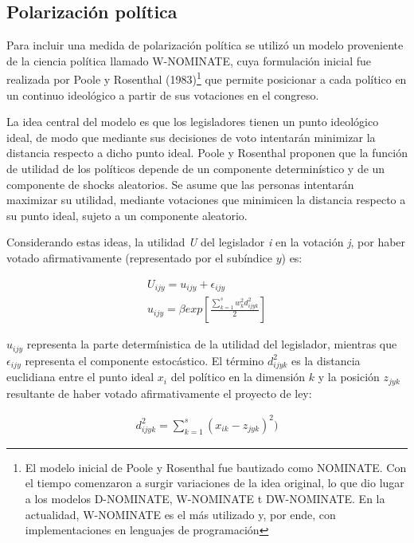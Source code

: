 \documentclass[
  12pt,
]{article}
\begin{document}
\hypertarget{polarizaciuxf3n-poluxedtica}{%
\subsection{\texorpdfstring{Polarización política
\label{apartado_nominate}}{Polarización política }}\label{polarizaciuxf3n-poluxedtica}}

Para incluir una medida de polarización política se utilizó un modelo
proveniente de la ciencia política llamado W-NOMINATE, cuya formulación
inicial fue realizada por Poole y Rosenthal
(1983)\footnote{El modelo inicial de Poole y Rosenthal fue bautizado como NOMINATE. Con el tiempo comenzaron a surgir variaciones de la idea original, lo que dio lugar a los modelos D-NOMINATE, W-NOMINATE t DW-NOMINATE. En la actualidad, W-NOMINATE es el más utilizado y, por ende, con implementaciones en lenguajes de programación}
que permite posicionar a cada político en un continuo ideológico a
partir de sus votaciones en el congreso.

La idea central del modelo es que los legisladores tienen un punto
ideológico ideal, de modo que mediante sus decisiones de voto intentarán
minimizar la distancia respecto a dicho punto ideal. Poole y Rosenthal
proponen que la función de utilidad de los políticos depende de un
componente determinístico y de un componente de shocks aleatorios. Se
asume que las personas intentarán maximizar su utilidad, mediante
votaciones que minimicen la distancia respecto a su punto ideal, sujeto
a un componente aleatorio.

Considerando estas ideas, la utilidad \emph{U} del legislador \emph{i}
en la votación \emph{j}, por haber votado afirmativamente (representado
por el subíndice \(y\)) es:

\begin{align}
\label{formula_poole}
U_{ijy} = u_{ijy} + \epsilon_{ijy} \\
u_{ijy} = \beta exp[\frac{\sum_{k=1}^{s}w_{k}^2d_{ijyk}^2 }{2}] 
\end{align}

\(u_{ijy}\) representa la parte determínistica de la utilidad del
legislador, mientras que \(\epsilon_{ijy}\) representa el componente
estocástico. El término \(d_{ijyk}^2\) es la distancia euclidiana entre
el punto ideal \(x_i\) del político en la dimensión \(k\) y la posición
\(z_{jyk}\) resultante de haber votado afirmativamente el proyecto de
ley:

\begin{align}
\label{formula_distancia}
d_{ijyk}^2 = \sum_{k=1}^{s}(x_{ik} - z_{jyk})^2)
\end{align}
\end{document}

